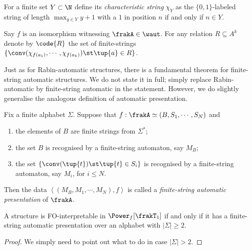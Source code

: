 \begin{definition}
For a finite set $Y \subset \N$ define
its {\em characteristic string} $\chi_Y$ as the $\{0,1\}$-labeled string of length $\max_{y \in Y} y + 1$ with a $1$ in position $n$ if and only if $n \in Y$.
\end{definition}

\begin{definition}
Say $f$ is an isomorphism witnessing $\frakA \in \waut$. For any relation $R \subseteq A^k$ denote by
$\code{R}$ the set of finite-strings  $\{\conv(\chi_{f(a_1)},\cdots,\chi_{f(a_k)}) \st  \tup{a} \in R\}$.  %
\end{definition}

Just as for Rabin-automatic structures, there is a fundamental theorem for finite-string automatic structures. We do not state it in full;
simply replace Rabin-automatic by finite-string automatic in the statement.
However, we do slightly generalise the analogous definition of automatic presentation.

\begin{definition} \label{AS:dfn:fsap}
Fix a finite alphabet $\Sigma$. Suppose that $f: \frakA \simeq  (B,S_1,\cdots,S_N)$ and
\begin{enumerate}
\item the elements of $B$ are finite strings from $\Sigma^\ast$;
\item the set $B$ is recognised by a finite-string automaton, say $M_B$; 
\item the set $\{\conv(\tup{t}) \st \tup{t} \in S_i\}$ is recognised by a finite-string automaton, say $M_i$, for $i \leq N$.
\end{enumerate}
Then the data $\left<(M_B,M_1,\cdots,M_N), f \right>$ is called a {\em finite-string automatic presentation} of $\frakA$.
\end{definition}

\begin{proposition}
A structure is FO-interpretable in $\Power_f[\frakT_1]$ if and only if it 
has a finite-string automatic presentation over an alphabet with $|\Sigma| \geq 2$.
\end{proposition}

\begin{proof}
 We simply need to point out what to do in case $|\Sigma| > 2$.
\end{proof}

